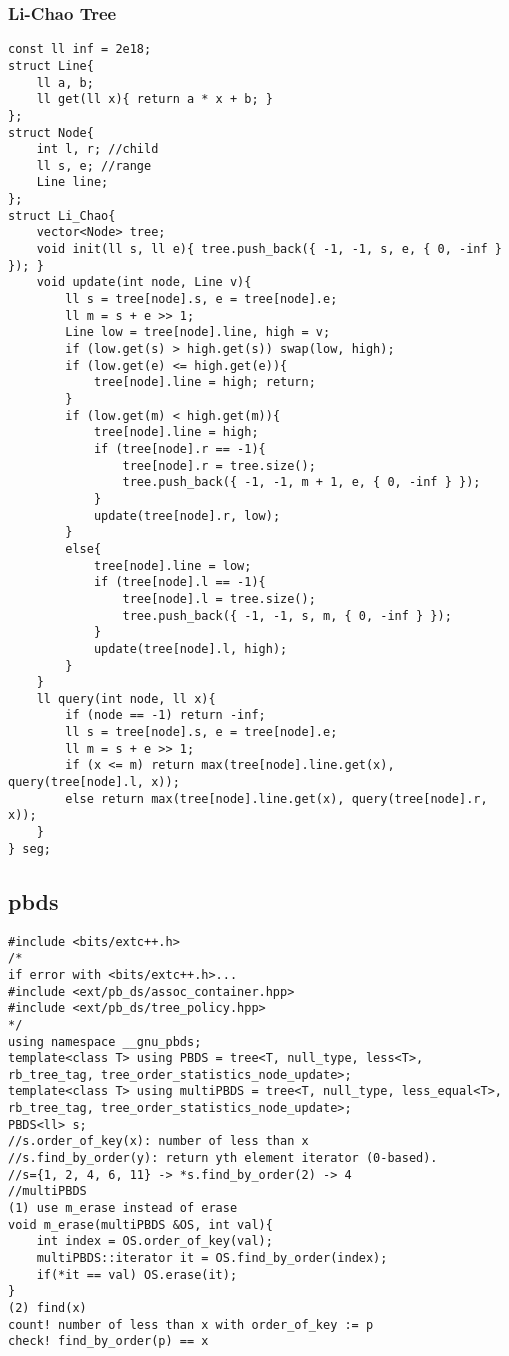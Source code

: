 \documentclass[landscape, 8pt, a4paper, oneside, twocolumn]{extarticle}
\begin{document}
\subsubsection {Li-Chao Tree}
\begin{verbatim}
const ll inf = 2e18;
struct Line{
	ll a, b;
	ll get(ll x){ return a * x + b; }
};
struct Node{
	int l, r; //child
	ll s, e; //range
	Line line;
};
struct Li_Chao{
	vector<Node> tree;
	void init(ll s, ll e){ tree.push_back({ -1, -1, s, e, { 0, -inf } }); }
	void update(int node, Line v){
		ll s = tree[node].s, e = tree[node].e;
		ll m = s + e >> 1;
		Line low = tree[node].line, high = v;
		if (low.get(s) > high.get(s)) swap(low, high);
		if (low.get(e) <= high.get(e)){
			tree[node].line = high; return;
		}
		if (low.get(m) < high.get(m)){
			tree[node].line = high;
			if (tree[node].r == -1){
				tree[node].r = tree.size();
				tree.push_back({ -1, -1, m + 1, e, { 0, -inf } });
			}
			update(tree[node].r, low);
		}
		else{
			tree[node].line = low;
			if (tree[node].l == -1){
				tree[node].l = tree.size();
				tree.push_back({ -1, -1, s, m, { 0, -inf } });
			}
			update(tree[node].l, high);
		}
	}
	ll query(int node, ll x){
		if (node == -1) return -inf;
		ll s = tree[node].s, e = tree[node].e;
		ll m = s + e >> 1;
		if (x <= m) return max(tree[node].line.get(x), query(tree[node].l, x));
		else return max(tree[node].line.get(x), query(tree[node].r, x));
	}
} seg;
\end{verbatim}
\newpage
\subsection {pbds}
\begin{verbatim}
#include <bits/extc++.h>
/*
if error with <bits/extc++.h>...
#include <ext/pb_ds/assoc_container.hpp>
#include <ext/pb_ds/tree_policy.hpp>
*/
using namespace __gnu_pbds;
template<class T> using PBDS = tree<T, null_type, less<T>, rb_tree_tag, tree_order_statistics_node_update>;
template<class T> using multiPBDS = tree<T, null_type, less_equal<T>, rb_tree_tag, tree_order_statistics_node_update>;
PBDS<ll> s;
//s.order_of_key(x): number of less than x
//s.find_by_order(y): return yth element iterator (0-based).
//s={1, 2, 4, 6, 11} -> *s.find_by_order(2) -> 4
//multiPBDS
(1) use m_erase instead of erase
void m_erase(multiPBDS &OS, int val){
    int index = OS.order_of_key(val);
    multiPBDS::iterator it = OS.find_by_order(index);
    if(*it == val) OS.erase(it);
}
(2) find(x)
count! number of less than x with order_of_key := p
check! find_by_order(p) == x
\end{verbatim}
\newpage
\end{document}
